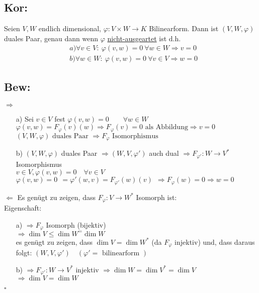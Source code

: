 \documentclass[titlepage,12pt,a4paper,ngerman]{report}
\newcommand{\tx}[1]{\textrm{#1}}
\begin{document}
\subsection{Kor:}
Seien $V,W$ endlich dimensional, $\varphi:V \times W \to K$ Bilinearform. Dann ist $(V,W,\varphi)$ duales Paar, genau dann wenn $\varphi$ \underline{nicht-ausgeartet} ist d.h.
\begin{align*}
&a) \forall v \in V:\ \varphi(v,w) = 0\ \forall w \in W \Rightarrow v = 0 \\
&b) \forall w \in W:\ \varphi(v,w) = 0\ \forall v \in V \Rightarrow w = 0
\end{align*}
\subsection{Bew:}
$\boxed{\Rightarrow}$
\begin{itemize}
	\item[a)] Sei $  v\in V $ fest $ \varphi(v,w) = 0 \qquad \forall w \in W $\\
	$ \varphi (v,w) = F _{\varphi} (v)(w) \Rightarrow F_{\varphi} (v) = 0  \tx{ als Abbildung} \Rightarrow v = 0$\\
	$ (V,W,\varphi) \tx{ duales Paar } \Rightarrow F_{\varphi} \tx{ Isomorphismus } $
	\item[b)] $ (V,W,\varphi) $ duales Paar $ \Rightarrow (W,V,\varphi') $ auch dual $ \Rightarrow F_{\varphi'}: W \to V^* $ Isomorphismus\\
	$ v\in V , \varphi(v,w) = 0 \quad \forall v \in V $\\
	$ \varphi(v,w) = 0 \ \ = \varphi'(w,v) = F_{\varphi'} (w)(v) \ \ \Rightarrow F_{\varphi}(w) = 0 \Rightarrow w = 0 $
\end{itemize}
$ \boxed{\Leftarrow} $ Es genügt zu zeigen, dass $ F_{\varphi}: V \to W^* $ Isomorph ist: \\
Eigenschaft:
\begin{itemize}
	\item[a)] $ \Rightarrow F_{\varphi} $ Isomorph (bijektiv)\\
	$ \Rightarrow \dim V \le \dim W^ = \dim W $\\
	es genügt zu zeigen, dass $ \dim V = \dim W^* $ (da $ F_{\varphi} $ injektiv)  und, dass daraus folgt: $ (W,V,\varphi') \quad  (\varphi' = \tx{ bilinearform } ) $
	\item[b)] $ \Rightarrow F_{\varphi'}: W \to V^* $ injektiv $ \Rightarrow \dim W = \dim V^* = \dim V $\\
	$ \Rightarrow \dim V = \dim W $
\end{itemize}
\begin{flushright}
	$ \square $
\end{flushright}
\end{document}
